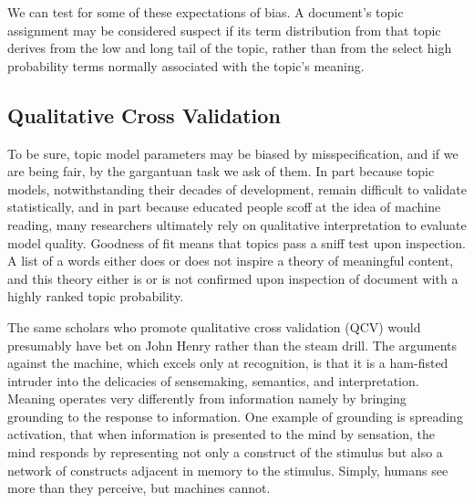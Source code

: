 \documentclass[]{book}
\theoremstyle{definition}
\theoremstyle{definition}
\theoremstyle{definition}
\theoremstyle{remark}
\begin{document}
We can test for some of these expectations of bias. A document's topic
assignment may be considered suspect if its term distribution from that
topic derives from the low and long tail of the topic, rather than from
the select high probability terms normally associated with the topic's
meaning.

\hypertarget{qualitative-cross-validation}{%
\subsection{Qualitative Cross
Validation}\label{qualitative-cross-validation}}

To be sure, topic model parameters may be biased by misspecification,
and if we are being fair, by the gargantuan task we ask of them. In part
because topic models, notwithstanding their decades of development,
remain difficult to validate statistically, and in part because educated
people scoff at the idea of machine reading, many researchers ultimately
rely on qualitative interpretation to evaluate model quality. Goodness
of fit means that topics pass a sniff test upon inspection. A list of a
words either does or does not inspire a theory of meaningful content,
and this theory either is or is not confirmed upon inspection of
document with a highly ranked topic probability.

The same scholars who promote qualitative cross validation (QCV) would
presumably have bet on John Henry rather than the steam drill. The
arguments against the machine, which excels only at recognition, is that
it is a ham-fisted intruder into the delicacies of sensemaking,
semantics, and interpretation. Meaning operates very differently from
information namely by bringing grounding to the response to information.
One example of grounding is spreading activation, that when information
is presented to the mind by sensation, the mind responds by representing
not only a construct of the stimulus but also a network of constructs
adjacent in memory to the stimulus. Simply, humans see more than they
perceive, but machines cannot.
\end{document}
